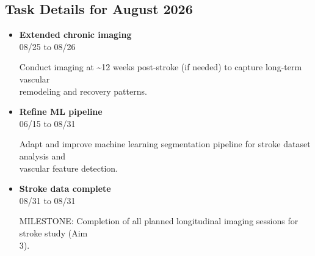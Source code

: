 \documentclass[landscape,a4paper]{article}
\begin{document}

\vspace{0.5cm}
\subsection{Task Details for August 2026}
\begin{itemize}[leftmargin=1cm, itemsep=0.8em]
    \item \textcolor{other}{\textbf{Extended chronic imaging}}\\[0.2em]
          \textcolor{black!70}{\small 08/25 to 08/26}
\\[0.3em]
          \begin{minipage}[t]{0.85\textwidth}
          \textcolor{black!80}{Conduct imaging at \textasciitilde{}12 weeks post-stroke (if needed) to capture long-term vascular\\[0.1em]
          remodeling and recovery patterns.}
          \end{minipage}

    \item \textcolor{other}{\textbf{Refine ML pipeline}}\\[0.2em]
          \textcolor{black!70}{\small 06/15 to 08/31}
\\[0.3em]
          \begin{minipage}[t]{0.85\textwidth}
          \textcolor{black!80}{Adapt and improve machine learning segmentation pipeline for stroke dataset analysis and\\[0.1em]
          vascular feature detection.}
          \end{minipage}

    \item \textcolor{other}{\textbf{Stroke data complete}}\\[0.2em]
          \textcolor{black!70}{\small 08/31 to 08/31}
\\[0.3em]
          \begin{minipage}[t]{0.85\textwidth}
          \textcolor{black!80}{MILESTONE: Completion of all planned longitudinal imaging sessions for stroke study (Aim\\[0.1em]
          3).}
          \end{minipage}

\end{itemize}
\end{document}
